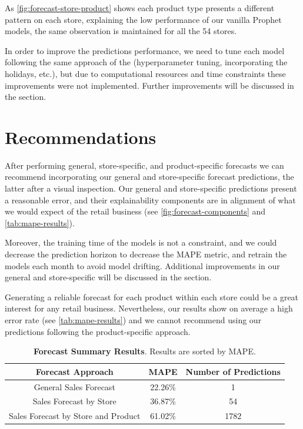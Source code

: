 As \autoref{fig:forecast-store-product} shows each product type presents a different pattern on each store, explaining the low performance of our vanilla Prophet models, the same observation is maintained for all the 54 stores.

In order to improve the predictions performance, we need to tune each model following the same approach of the  (hyperparameter tuning, incorporating the holidays, etc.), but due to computational resources and time constraints these improvements were not implemented. Further improvements will be discussed in the  section. 

\section[Recommendations]{Recommendations}
\label{sec:recommendations}

After performing general, store-specific, and product-specific forecasts we can recommend incorporating our general and store-specific forecast predictions, the latter after a visual inspection. Our general and store-specific predictions present a reasonable error, and their explainability components are in alignment of what we would expect of the retail business (see \autoref{fig:forecast-components} and \autoref{tab:mape-results}). 

Moreover, the training time of the models is not a constraint, and we could decrease the prediction horizon to decrease the MAPE metric, and retrain the models each month to avoid model drifting. Additional improvements in our general and store-specific will be discussed in the  section.

Generating a reliable forecast for each product within each store could be a great interest for any retail business. Nevertheless, our results show on average a high error rate (see \autoref{tab:mape-results}) and we cannot recommend using our predictions following the product-specific approach. 

\begin{table}[!htb]
  \caption[Kaggle files description]{\textbf{Forecast Summary Results}. Results are sorted by MAPE.}
  \begin{scriptsize}
    \begin{tabulary}{0.65\linewidth}{ccc}
      \textbf{Forecast Approach} & \textbf{MAPE} & \textbf{Number of Predictions} \\ \hline
      General Sales Forecast & 22.26\% & 1  \\
      Sales Forecast by Store & 36.87\% & 54  \\
      Sales Forecast by Store and Product & 61.02\% & 1782  \\
    \end{tabulary}
  \end{scriptsize}
  \label{tab:mape-results}
\end{table}

